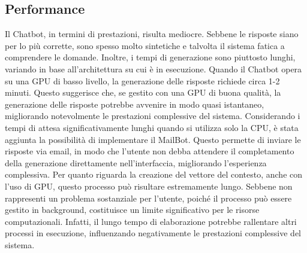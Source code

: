 \subsection{Performance}
Il Chatbot, in termini di prestazioni, risulta mediocre. Sebbene le risposte siano per lo più corrette, sono spesso molto sintetiche e talvolta il sistema fatica a comprendere le domande. Inoltre, i tempi di generazione sono piuttosto lunghi, variando in base all'architettura su cui è in esecuzione. 
Quando il Chatbot opera su una GPU di basso livello, la generazione delle risposte richiede circa 1-2 minuti. Questo suggerisce che, se gestito con una GPU di buona qualità, la generazione delle risposte potrebbe avvenire in modo quasi istantaneo, migliorando notevolmente le prestazioni complessive del sistema.
Considerando i tempi di attesa significativamente lunghi quando si utilizza solo la CPU, è stata aggiunta la possibilità di implementare il MailBot. Questo permette di inviare le risposte via email, in modo che l'utente non debba attendere il completamento della generazione direttamente nell'interfaccia, migliorando l'esperienza complessiva.
Per quanto riguarda la creazione del vettore del contesto, anche con l'uso di GPU, questo processo può risultare estremamente lungo. Sebbene non rappresenti un problema sostanziale per l'utente, poiché il processo può essere gestito in background, costituisce un limite significativo per le risorse computazionali. Infatti, il lungo tempo di elaborazione potrebbe rallentare altri processi in esecuzione, influenzando negativamente le prestazioni complessive del sistema.

